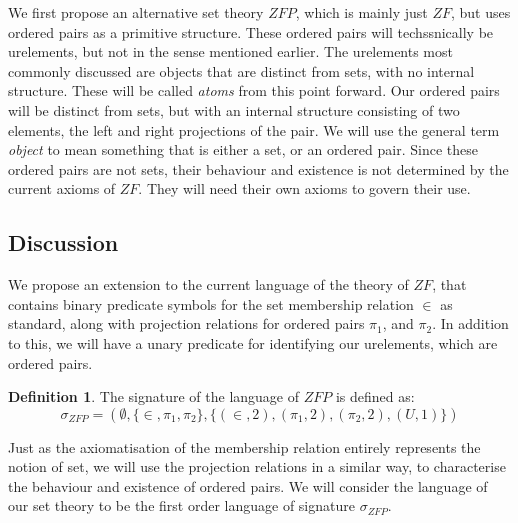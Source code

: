 \documentclass[11pt]{report}
\newcommand{\pleft}{\mathrel{\pi_1}}
\newcommand{\pright}{\mathrel{\pi_2}}
\theoremstyle{definition}
\theoremstyle{theorem}
\theoremstyle{lemma}
\newtheorem{definition}{Definition}[section]
\begin{document}
We first propose an alternative set theory $\mathit{ZFP}$, which is mainly just $\mathit{ZF}$, but uses ordered pairs as a primitive structure.
These ordered pairs will techssnically be urelements, but not in the sense mentioned earlier.
The urelements most commonly discussed are objects that are distinct from sets, with no internal structure.
These will be called \emph{atoms} from this point forward.
Our ordered pairs will be distinct from sets, but with an internal structure consisting of two elements, the left and right projections of the pair.
We will use the general term \emph{object} to mean something that is either a set, or an ordered pair.
Since these ordered pairs are not sets, their behaviour and existence is not determined by the current axioms of $\mathit{ZF}$.
They will need their own axioms to govern their use.

\subsection{Discussion}
We propose an extension to the current language of the theory of $\mathit{ZF}$, that contains binary predicate symbols for the set membership relation $\in$ as standard, along with projection relations for ordered pairs $\pleft$, and $\pright$.
In addition to this, we will have a unary predicate for identifying our urelements, which are ordered pairs.
\begin{definition}
The signature of the language of $\mathit{ZFP}$ is defined as:
$$\sigma_\mathit{ZFP} = (\emptyset,\{\in, \pleft, \pright\},\{(\in,2),(\pleft,2),(\pright,2),(\mathit{U},1)\})$$
\end{definition}
\noindent
Just as the axiomatisation of the membership relation entirely represents the notion of set, we will use the projection relations in a similar way, to characterise the behaviour and existence of ordered pairs.
We will consider the language of our set theory to be the first order language of signature $\sigma_\mathit{ZFP}$.
\end{document}
